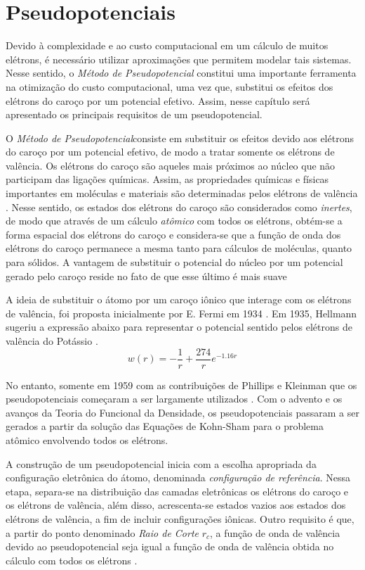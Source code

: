 \section{Pseudopotenciais}

Devido à complexidade e ao custo computacional em um cálculo de muitos elétrons, é necessário utilizar aproximações que permitem modelar tais sistemas. Nesse sentido, o \textit{Método de Pseudopotencial} constitui uma importante ferramenta na otimização do custo computacional, uma vez que, substitui os efeitos dos elétrons do caroço por um potencial efetivo. Assim, nesse capítulo será apresentado os principais requisitos de um pseudopotencial.

O \textit{Método de Pseudopotencial}consiste em substituir os efeitos devido aos elétrons do caroço por um potencial efetivo, de modo a tratar somente os elétrons de valência. Os elétrons do caroço são aqueles mais próximos ao núcleo que não participam das ligações químicas. Assim, as propriedades químicas e físicas importantes em moléculas e materiais são determinadas pelos elétrons de valência \cite{tese_pseudo}. Nesse sentido, os estados dos elétrons do caroço são considerados como \textit{inertes}, de modo que através de um cálculo \textit{atômico} com todos os elétrons, obtém-se a forma espacial dos elétrons do caroço e considera-se que a função de onda dos elétrons do caroço permanece a mesma tanto para cálculos de moléculas, quanto para sólidos. A vantagem de substituir o potencial do núcleo por um potencial gerado pelo caroço reside no fato de que esse último é mais suave \cite{book_base}

A ideia de substituir o átomo por um caroço iônico que interage com os elétrons de valência, foi proposta inicialmente por E. Fermi em 1934 \cite{fermi}. Em 1935, Hellmann sugeriu a expressão abaixo para representar o potencial sentido pelos elétrons de valência do Potássio \cite{fermi_2}.
\begin{equation}
	w(r)=-\frac{1}{r}+\frac{274}{r}e^{-1.16r }
\end{equation}

No entanto, somente em 1959 com as contribuições de Phillips e Kleinman que os pseudopotenciais começaram a ser largamente utilizados \cite{pseudo_ref}. Com o advento e os avanços da Teoria do Funcional da Densidade, os pseudopotenciais passaram a ser gerados a partir da solução das Equações de Kohn-Sham para o problema atômico envolvendo todos os elétrons. \cite{toffoli_pseudo}

A construção de um pseudopotencial inicia com a escolha apropriada da configuração eletrônica do átomo, denominada \textit{configuração de referência}. Nessa etapa, separa-se na distribuição das camadas eletrônicas os elétrons do caroço e os elétrons de valência, além disso, acrescenta-se estados vazios aos estados dos elétrons de valência, a fim de incluir configurações iônicas. Outro requisito é que, a partir do ponto denominado \textit{Raio de Corte} $ r_c $, a função de onda de valência devido ao pseudopotencial seja igual a função de onda de valência obtida no cálculo com todos os elétrons \cite{book_base}. 

